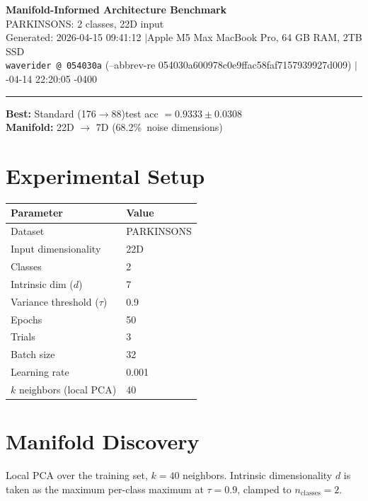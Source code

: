 \documentclass[11pt,letterpaper]{article}
\begin{document}
\begin{center}
  {\LARGE\bfseries\color{wavblue} Manifold-Informed Architecture Benchmark}\\[6pt]
  {\large PARKINSONS: 2 classes, 22D input}\\[8pt]
  {\small Generated: 2026-04-15 09:41:12 \quad$|$\quad Apple M5 Max MacBook Pro, 64 GB RAM, 2TB SSD}\\[2pt]
  {\small\texttt{waverider @ 054030a} (--abbrev-re
054030a600978c0e9ffac58faf7157939927d009) \quad$|$-04-14 22:20:05 -0400}
\end{center}
{\color{wavblue}\noindent\rule{\linewidth}{1.5pt}}
\medskip

\noindent\colorbox{wavlight}{\parbox{\dimexpr\linewidth-2\fboxsep\relax}{
  \smallskip
  \textbf{Best:} Standard (176$\rightarrow$88)\quad test acc $= 0.9333 \pm 0.0308$\\[2pt]
  \textbf{Manifold:} 22D $\rightarrow$ 7D (68.2\%\ noise dimensions)\\[2pt]
  \smallskip
}}
\bigskip

\section{Experimental Setup}

\begin{tabular}{@{}ll@{}}
\toprule
\textbf{Parameter} & \textbf{Value} \\
\midrule
  Dataset & PARKINSONS \\
  Input dimensionality & 22D \\
  Classes & 2 \\
  Intrinsic dim ($d$) & 7 \\
  Variance threshold ($\tau$) & 0.9 \\
  Epochs & 50 \\
  Trials & 3 \\
  Batch size & 32 \\
  Learning rate & 0.001 \\
  $k$ neighbors (local PCA) & 40 \\
\bottomrule
\end{tabular}

\section{Manifold Discovery}

Local PCA over the training set, $k = 40$ neighbors. Intrinsic dimensionality $d$ is taken as the maximum per-class maximum at $\tau = 0.9$, clamped to $n_{\mathrm{classes}} = 2$.
\end{document}

